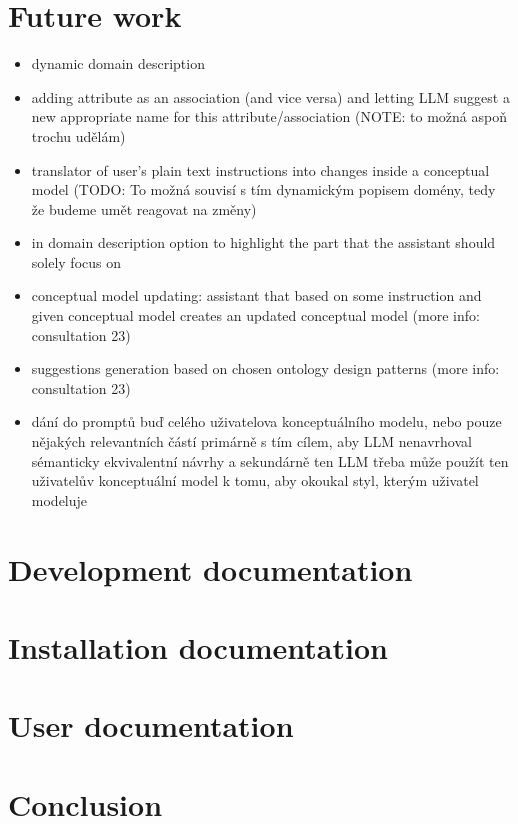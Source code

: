 \chapter{Future work}

\begin{itemize}
\item dynamic domain description
\item adding attribute as an association (and vice versa) and letting LLM suggest a new appropriate name for this attribute/association (NOTE: to možná aspoň trochu udělám)
\item translator of user's plain text instructions into changes inside a conceptual model (TODO: To možná souvisí s tím dynamickým popisem domény, tedy že budeme umět reagovat na změny)
\item in domain description option to highlight the part that the assistant should solely focus on
\item conceptual model updating: assistant that based on some instruction and given conceptual model creates an updated conceptual model (more info: consultation 23)
\item suggestions generation based on chosen ontology design patterns (more info: consultation 23)
\item dání do promptů buď celého uživatelova konceptuálního modelu, nebo pouze nějakých relevantních částí primárně s tím cílem, aby LLM nenavrhoval sémanticky ekvivalentní návrhy a sekundárně ten LLM třeba může použít ten uživatelův konceptuální model k tomu, aby okoukal styl, kterým uživatel modeluje
\end{itemize}


\chapter{Development documentation}
\chapter{Installation documentation}
\chapter{User documentation}
\chapter{Conclusion}
